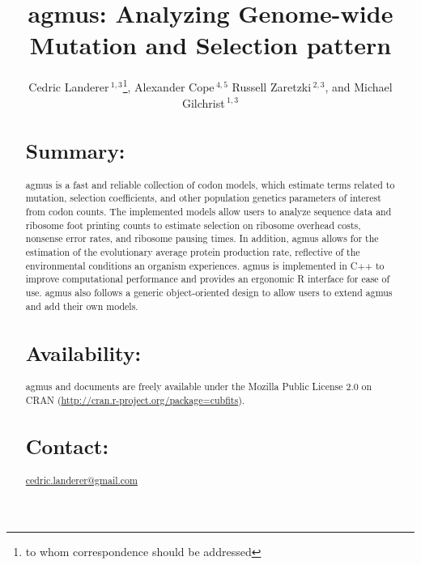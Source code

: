 \documentclass{bioinfo}
\newcommand{\pkg}[1]{{\fontseries{b}\selectfont #1}}
\newcommand{\package}{agmus } %
\begin{document}

\title[agmus]{agmus: Analyzing Genome-wide Mutation and Selection pattern}
\author[
Landerer \textit{et~al}]{Cedric Landerer\,$^{1,3}$\footnote{
to whom correspondence should be addressed
},
Alexander Cope\,$^{4,5}$
Russell Zaretzki\,$^{2,3}$, and
Michael Gilchrist\,$^{1,3}$
}
\address{$^{1}$
Department of Ecology and Evolutionary Biology,
$^{2}$Department of Statistics, Operations, and Management Science, and
$^{3}$National Institute for Mathematical and Biological Synthesis,
University of Tennessee, Knoxville, TN, USA,
$^{4}$Genome Science and Technology, University of Tennessee, Knoxville, TN, USA
$^{5}$Oak Ridge National Labratory, Oak Ridge, TN, USA} 


\maketitle

\begin{abstract}

\section{Summary:}
\pkg{\package} is a fast and reliable collection of codon models, which estimate terms related to mutation, selection coefficients, and other population genetics parameters of interest from codon counts. 
The implemented models allow users to analyze sequence data and ribosome foot printing counts to estimate selection on ribosome overhead costs, nonsense error rates, and ribosome pausing times. 
In addition, \package allows for the estimation of the evolutionary average protein production rate, reflective of the environmental conditions an organism experiences. 
\package is implemented in C++ to improve computational performance and provides an ergonomic R interface for ease of use. 
\package also follows a generic object-oriented design to allow users to extend \package and add their own models.

\section{Availability:}
\pkg{\package} and documents are freely available under the Mozilla Public License 2.0
on CRAN (\url{http://cran.r-project.org/package=cubfits}).

\section{Contact:} \href{cedric.landerer@gmail.com}{cedric.landerer@gmail.com}
\end{abstract}
\end{document}
